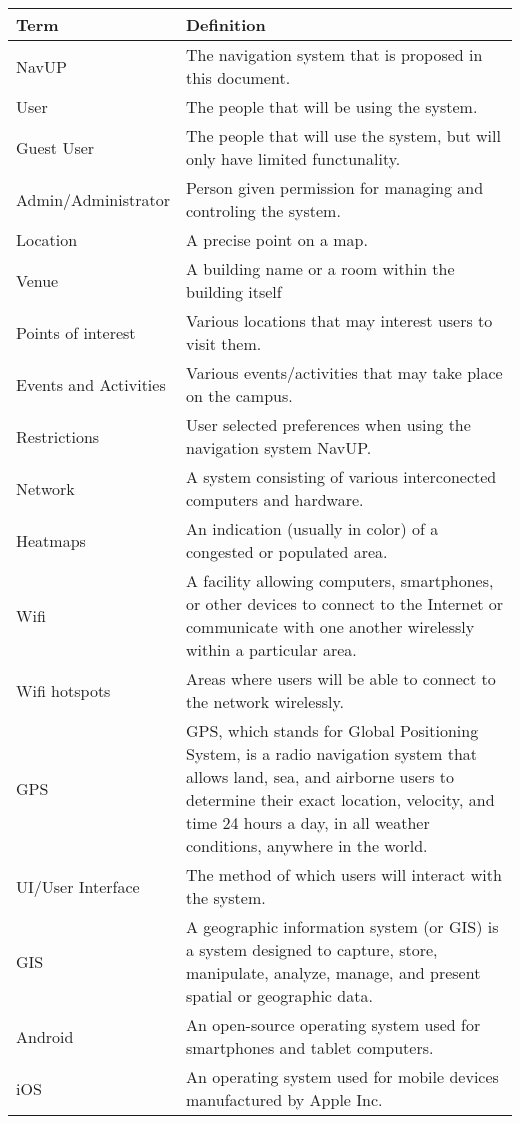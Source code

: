 \begin{center}
    \begin{tabular}{| l | p{7cm} |}
    \hline
    \textbf{Term} & \textbf{Definition} \\ \hline
	NavUP & The navigation system that is proposed in this document. \\ \hline
	User & The people that will be using the system. \\ \hline
	Guest User & The people that will use the system, but will only have limited functunality. \\ \hline
	Admin/Administrator & Person given permission for managing and controling the system. \\ \hline
	Location & A precise point on a map. \\ \hline
	Venue & A building name or a room within the building itself \\ \hline
	Points of interest & Various locations that may interest users to visit them. \\ \hline
	Events and Activities & Various events/activities that may take place on the campus. \\ \hline
	Restrictions & User selected preferences when using the navigation system NavUP. \\ \hline
	Network & A system consisting of various interconected computers and hardware. \\ \hline
	Heatmaps & An indication (usually in color) of a congested or populated area. \\ \hline
	Wifi & A facility allowing computers, smartphones, or other devices to connect to the Internet or communicate with one another wirelessly within a particular area. \\ \hline
	Wifi hotspots & Areas where users will be able to connect to the network wirelessly. \\ \hline    
	GPS & GPS, which stands for Global Positioning System, is a radio navigation system that allows land, sea, and airborne users to determine their exact location, velocity, and time 24 hours a day, in all weather conditions, anywhere in the world. \\ \hline
	UI/User Interface & The method of which users will interact with the system. \\ \hline
	GIS & A geographic information system (or GIS) is a system designed to capture, store, manipulate, analyze, manage, and present spatial or geographic data. \\ \hline
	Android & An open-source operating system used for smartphones and tablet computers. \\ \hline
	iOS & An operating system used for mobile devices manufactured by Apple Inc. \\ \hline
    \end{tabular}
\end{center}
